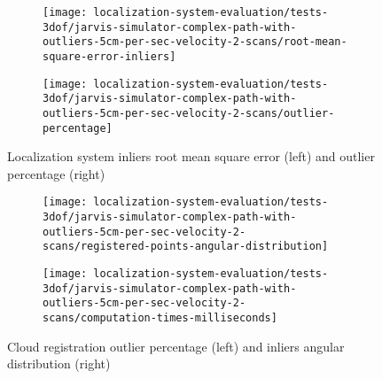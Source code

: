 \begin{figure}[ht]
	\centering
	\begin{subfigure}[h]{0.47\textwidth}
		\centering
		\texttt{[image: localization-system-evaluation/tests-3dof/jarvis-simulator-complex-path-with-outliers-5cm-per-sec-velocity-2-scans/root-mean-square-error-inliers]}
	\end{subfigure}
	\begin{subfigure}[h]{0.47\textwidth}
		\centering
		\texttt{[image: localization-system-evaluation/tests-3dof/jarvis-simulator-complex-path-with-outliers-5cm-per-sec-velocity-2-scans/outlier-percentage]}
	\end{subfigure}
	\caption{Localization system inliers root mean square error (left) and outlier percentage (right)}
	\label{fig:localization-system-evaluation_jarvis-simulator-complex-path-with-outliers-5cm-per-sec-velocity-2-scans_inliers-rmse-outliers-percentage}
\end{figure}

\begin{figure}[hb]
	\centering
	\begin{subfigure}[h]{0.47\textwidth}
		\centering
		\texttt{[image: localization-system-evaluation/tests-3dof/jarvis-simulator-complex-path-with-outliers-5cm-per-sec-velocity-2-scans/registered-points-angular-distribution]}
	\end{subfigure}
	\begin{subfigure}[h]{0.47\textwidth}
		\centering
		\texttt{[image: localization-system-evaluation/tests-3dof/jarvis-simulator-complex-path-with-outliers-5cm-per-sec-velocity-2-scans/computation-times-milliseconds]}
	\end{subfigure}
	\caption{Cloud registration outlier percentage (left) and inliers angular distribution (right)}
	\label{fig:localization-system-evaluation_jarvis-simulator-complex-path-with-outliers-5cm-per-sec-velocity-2-scans_angular-distribution-analysis-computation-time}
\end{figure}
